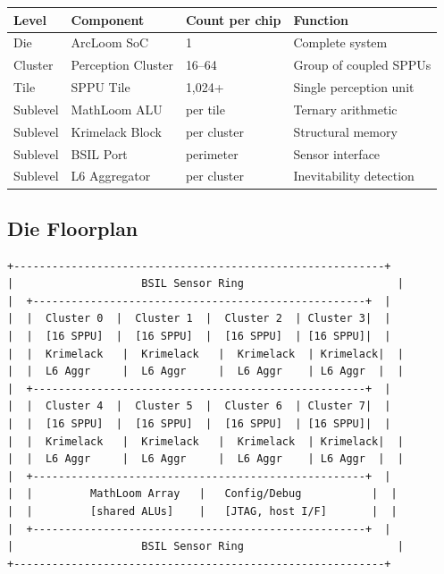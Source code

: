 \documentclass[11pt, a4paper]{article}
\begin{document}
\begin{center}
\begin{tabular}{@{}llll@{}}
\toprule
\textbf{Level} & \textbf{Component} & \textbf{Count per chip} & \textbf{Function} \\
\midrule
Die       & ArcLoom SoC       & 1         & Complete system \\
Cluster   & Perception Cluster & 16--64   & Group of coupled SPPUs \\
Tile      & SPPU Tile          & 1,024+   & Single perception unit \\
Sublevel  & MathLoom ALU       & per tile  & Ternary arithmetic \\
Sublevel  & Krimelack Block    & per cluster & Structural memory \\
Sublevel  & BSIL Port          & perimeter & Sensor interface \\
Sublevel  & L6 Aggregator      & per cluster & Inevitability detection \\
\bottomrule
\end{tabular}
\end{center}

\subsection{Die Floorplan}

\begin{verbatim}
+----------------------------------------------------------+
|                    BSIL Sensor Ring                        |
|  +----------------------------------------------------+  |
|  |  Cluster 0  |  Cluster 1  |  Cluster 2  | Cluster 3|  |
|  |  [16 SPPU]  |  [16 SPPU]  |  [16 SPPU]  | [16 SPPU]|  |
|  |  Krimelack   |  Krimelack   |  Krimelack  | Krimelack|  |
|  |  L6 Aggr     |  L6 Aggr     |  L6 Aggr    | L6 Aggr  |  |
|  +----------------------------------------------------+  |
|  |  Cluster 4  |  Cluster 5  |  Cluster 6  | Cluster 7|  |
|  |  [16 SPPU]  |  [16 SPPU]  |  [16 SPPU]  | [16 SPPU]|  |
|  |  Krimelack   |  Krimelack   |  Krimelack  | Krimelack|  |
|  |  L6 Aggr     |  L6 Aggr     |  L6 Aggr    | L6 Aggr  |  |
|  +----------------------------------------------------+  |
|  |         MathLoom Array   |   Config/Debug           |  |
|  |         [shared ALUs]    |   [JTAG, host I/F]       |  |
|  +----------------------------------------------------+  |
|                    BSIL Sensor Ring                        |
+----------------------------------------------------------+
\end{verbatim}
\end{document}
